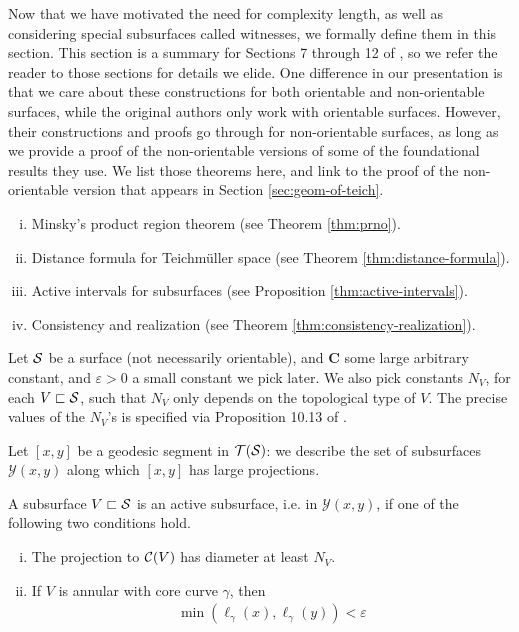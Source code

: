 \documentclass[12pt, reqno]{amsart}
\begin{document}
Now that we have motivated the need for complexity length, as well as considering special subsurfaces called witnesses, we formally define them in this section.
This section is a summary for Sections 7 through 12 of \textcite{dowdall2023lattice}, so we refer the reader to those sections for details we elide.
One difference in our presentation is that we care about these constructions for both orientable and non-orientable surfaces, while the original authors only work with orientable surfaces.
However, their constructions and proofs go through for non-orientable surfaces, as long as we provide a proof of the non-orientable versions of some of the foundational results they use.
We list those theorems here, and link to the proof of the non-orientable version that appears in Section \ref{sec:geom-of-teich}.
\begin{enumerate}[(i)]
\item Minsky's product region theorem (see Theorem \ref{thm:prno}).
\item Distance formula for Teichmüller space (see Theorem \ref{thm:distance-formula}).
\item Active intervals for subsurfaces (see Proposition \ref{thm:active-intervals}).
\item Consistency and realization (see Theorem \ref{thm:consistency-realization}).
\end{enumerate}

Let $\mathcal{S}$ be a surface (not necessarily orientable), and $\mathbf{C}$ some large arbitrary constant, and $\varepsilon > 0$ a small constant we pick later.
We also pick constants $N_V$, for each $V \sqsubset \mathcal{S}$, such that $N_V$ only depends on the topological type of $V$.
The precise values of the $N_V$'s is specified via Proposition 10.13 of \cite{dowdall2023lattice}.

Let $[x,y]$ be a geodesic segment in $\mathcal{T}(\mathcal{S})$: we describe the set of subsurfaces $\mathcal{Y}(x, y)$ along which $[x, y]$ has large projections.

\begin{definition}
  A subsurface $V \sqsubset \mathcal{S}$ is an active subsurface, i.e. in $\mathcal{Y}(x,y)$, if one of the following two conditions hold.
  \begin{enumerate}[(i)]
  \item The projection to $\mathcal{C}(V)$ has diameter at least $N_V$.
  \item If $V$ is annular with core curve $\gamma$, then
    \begin{align*}
      \min\left( \ell_\gamma(x), \ell_{\gamma}(y) \right) < \varepsilon
    \end{align*}
  \end{enumerate}
\end{definition}
\end{document}
